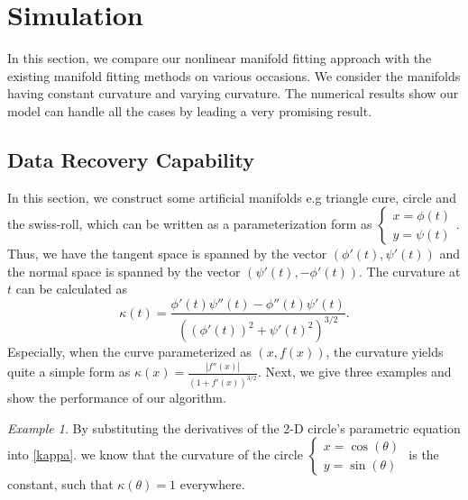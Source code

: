 \documentclass{article}
\theoremstyle{remark}
\newtheorem{example}{Example}
\begin{document}
\section{Simulation}
In this section, we compare our nonlinear manifold fitting approach with the existing manifold fitting methods on various occasions. We consider the manifolds having constant curvature and varying curvature. The numerical results show our model can handle all the cases by leading a very promising result.
\subsection{Data Recovery Capability}
In this section, we construct some artificial manifolds e.g triangle cure, circle and the swiss-roll, which can be written as a parameterization form as
$
\left\{
\begin{array}{c}
x = \phi(t)\\
y = \psi(t)
\end{array}
\right.
$.
Thus, we have the tangent space is spanned by the vector $(\phi'(t),\psi'(t))$ and the normal space is spanned by the vector $(\psi'(t),-\phi'(t))$. The curvature at $t$ can be calculated as
\begin{equation}\label{kappa}
\kappa(t) = \frac{\phi'(t)\psi''(t)-\phi''(t)\psi'(t)}{((\phi'(t))^2+\psi'(t)^2)^{3/2}}.
\end{equation}
Especially, when the curve parameterized as $(x,f(x))$, the curvature yields quite a simple form as
$\kappa(x) = \frac{|f''(x)|}{(1+f'(x))^{3/2}}$. Next, we give three examples and show the performance of our algorithm.
\begin{example}
By substituting the derivatives of the 2-D circle's parametric equation  into \eqref{kappa}. we know that the curvature of the circle $\left\{\begin{array}{c}
x= \cos(\theta)\\
y=\sin(\theta)
\end{array}\right.$ is the constant, such that $\kappa(\theta) = 1$ everywhere.
\end{example}
\end{document}
